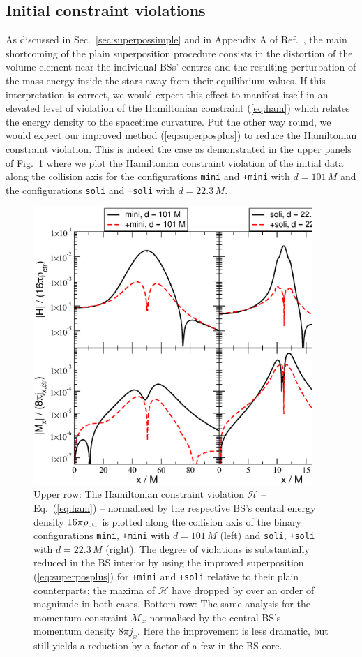 \documentclass[]{iopart}
\begin{document}
\subsection{Initial constraint violations}
%
As discussed in Sec.~\ref{sec:superpossimple} and in Appendix
A of Ref.~\cite{Helfer:2018vtq},
the main shortcoming of the plain superposition procedure
consists in the distortion of the volume element near the
individual BSs' centres and the resulting perturbation
of the mass-energy inside the stars away from their equilibrium
values. If this interpretation is correct, we would expect
this effect to manifest itself in an elevated level of violation
of the Hamiltonian constraint
(\ref{eq:ham}) which relates the energy density to the
spacetime curvature. Put the other way round, we would
expect our improved method (\ref{eq:superposplus}) to reduce the
Hamiltonian constraint violation. This is indeed the case
as demonstrated in the upper panels of
Fig.~\ref{fig:ham} where we plot the
Hamiltonian constraint violation of the initial data
along the collision axis for the configurations
{\tt mini} and {\tt +mini} with $d=101\,M$ and 
the configurations {\tt soli} and {\tt +soli} with
$d=22.3\,M$.
%
\begin{figure}
  \centering
  \includegraphics[width=300pt]{constraints.eps}
  \caption{Upper row: The Hamiltonian constraint violation $\mathcal{H}$ --
  Eq.~(\ref{eq:ham}) -- normalised by the respective BS's
  central energy density $16\pi \rho_{\rm ctr}$
  is plotted along the collision
  axis of the binary configurations {\tt mini}, {\tt +mini}
  with $d=101\,M$ (left) and {\tt soli}, {\tt +soli} with $d=22.3\,M$ (right).
  The degree of violations is substantially reduced in the
  BS interior by using
  the improved superposition (\ref{eq:superposplus})
  for {\tt +mini} and {\tt +soli} relative to their plain
  counterparts; the maxima of $\mathcal{H}$ have dropped by
  over an order of magnitude in both cases.
  Bottom row: The same analysis for the momentum constraint
  $\mathcal{M}_x$
  normalised by the central BS's momentum density
  $8\pi j_x$. Here the improvement is less dramatic,
  but still yields a reduction by a factor of a few
  in the BS core.
  }
  \label{fig:ham}
\end{figure}
%
\end{document}

